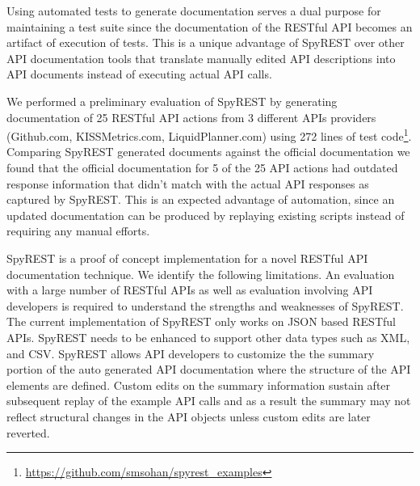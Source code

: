 \documentclass[conference]{IEEEtran}
\begin{document}
Using automated tests to generate documentation serves a dual purpose for maintaining a test suite since the documentation of the RESTful API becomes an artifact of execution of tests. This is a unique advantage of SpyREST over other API documentation tools that translate manually edited API descriptions into API documents instead of executing actual API calls.

We performed a preliminary evaluation of SpyREST by generating documentation of 25 RESTful API actions from 3 different APIs providers (Github.com, KISSMetrics.com, LiquidPlanner.com) using 272 lines of test code\footnote{\url{https://github.com/smsohan/spyrest_examples}}. Comparing SpyREST generated documents against the official documentation we found that the official documentation for 5 of the 25 API actions had outdated response information that didn't match with the actual API responses as captured by SpyREST. This is an expected advantage of automation, since an updated documentation can be produced by replaying existing scripts instead of requiring any manual efforts.

SpyREST is a proof of concept implementation for a novel RESTful API documentation technique. We identify the following limitations. An evaluation with a large number of RESTful APIs as well as evaluation involving API developers is required to understand the strengths and weaknesses of SpyREST. The current implementation of SpyREST only works on JSON based RESTful APIs. SpyREST needs to be enhanced to support other data types such as XML, and CSV. SpyREST allows API developers to customize the the summary portion of the auto generated API documentation where the structure of the API elements are defined. Custom edits on the summary information sustain after subsequent replay of the example API calls and as a result the summary may not reflect structural changes in the API objects unless custom edits are later reverted.
\end{document}

